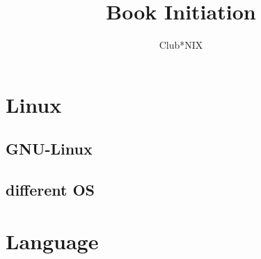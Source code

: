 \documentclass[a4paper]{report}
\title{Book Initiation}
\author{Club*NIX}
\begin{document}
\maketitle

\tableofcontents
\newpage


\chapter{Linux}
 \section{GNU-Linux}
    
 \section{different OS}
    
    
\chapter{Language}
\end{document}
